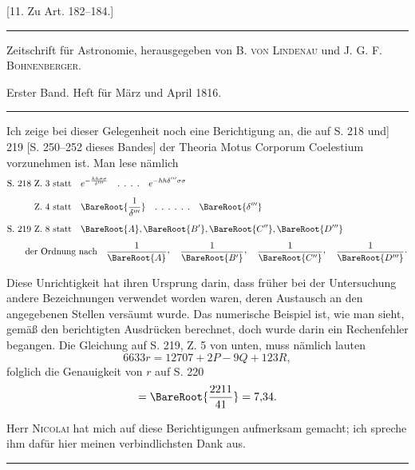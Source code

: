 \begin{center}
[11. Zu Art. 182--184.]
\end{center}
\begin{center}
\small
\rule{\textwidth}{.35pt}\par
Zeitschrift für Astronomie, herausgegeben von B. \textsc{von Lindenau} und J. G. F. \textsc{Bohnenberger}.\par
Erster Band. Heft für März und April 1816.\par
\rule{\textwidth}{.35pt}
\end{center}
Ich zeige bei dieser Gelegenheit noch eine Berichtigung an, die auf S. 218 und] 219 [S. 250--252 dieses Bandes] der Theoria Motus Corporum Coelestium vorzunehmen ist. Man lese nämlich
\[
\begin{aligned}
&\text{S. 218 Z. 3 statt}\quad e^{-\frac{hh\sigma\sigma}{\delta'''}}\quad\text{. . . .}\quad e^{-hh\delta'''\sigma\sigma}\\[5pt]
&\phantom{\text{S. 218 }}\text{Z. 4 statt}\quad\BareRoot{\frac{1}{\delta'''}}\quad\text{. . . . . .}\quad\BareRoot{\delta'''}\\[5pt]
&\text{S. 219 Z. 8 statt}\quad\BareRoot{A},\BareRoot{B'},\BareRoot{C''},\BareRoot{D'''}\\[4pt]
&\qquad\text{der Ordnung nach}\quad
\frac{1}{\BareRoot{A}}\mathpunct{\raisebox{.45ex}{,}}\quad
\frac{1}{\BareRoot{B'}}\mathpunct{\raisebox{.45ex}{,}}\quad
\frac{1}{\BareRoot{C''}}\mathpunct{\raisebox{.45ex}{,}}\quad
\frac{1}{\BareRoot{D'''}}\mathpunct{\cdot}
\end{aligned}
\]

Diese Unrichtigkeit hat ihren Ursprung darin, dass früher bei der Untersuchung andere Bezeichnungen verwendet worden waren, deren Austausch an den angegebenen Stellen versäumt wurde. Das numerische Beispiel ist, wie man sieht, gemäß den berichtigten Ausdrücken berechnet, doch wurde darin ein Rechenfehler begangen. Die Gleichung auf S. 219, Z. 5 von unten, muss nämlich lauten
\[
6633r=12707+2P-9Q+123R,
\]
folglich die Genauigkeit von \(r\) auf S. 220
\[
=\BareRoot{\frac{2211}{41}}=7{,}34.
\]

Herr \textsc{Nicolai} hat mich auf diese Berichtigungen aufmerksam gemacht; ich spreche ihm dafür hier meinen verbindlichsten Dank aus.
\begin{center}\rule{.18\textwidth}{.35pt}\end{center}
